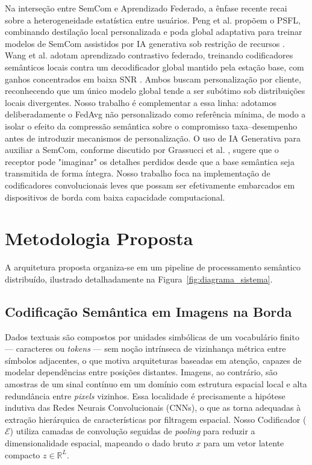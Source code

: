 \documentclass[conference]{IEEEtran}
\begin{document}
Na interseção entre SemCom e Aprendizado Federado, a ênfase recente recai sobre a heterogeneidade estatística entre usuários. Peng et al. propõem o PSFL, combinando destilação local personalizada e poda global adaptativa para treinar modelos de SemCom assistidos por IA generativa sob restrição de recursos \cite{peng2024psfl}. Wang et al. adotam aprendizado contrastivo federado, treinando codificadores semânticos locais contra um decodificador global mantido pela estação base, com ganhos concentrados em baixa SNR \cite{wang2024fedcl}. Ambos buscam personalização por cliente, reconhecendo que um único modelo global tende a ser subótimo sob distribuições locais divergentes. Nosso trabalho é complementar a essa linha: adotamos deliberadamente o FedAvg não personalizado como referência mínima, de modo a isolar o efeito da compressão semântica sobre o compromisso taxa--desempenho antes de introduzir mecanismos de personalização. O uso de IA Generativa para auxiliar a SemCom, conforme discutido por Grassucci et al. \cite{grassucci2023genai_meets_semcom}, sugere que o receptor pode "imaginar" os detalhes perdidos desde que a base semântica seja transmitida de forma íntegra. Nosso trabalho foca na implementação de codificadores convolucionais leves que possam ser efetivamente embarcados em dispositivos de borda com baixa capacidade computacional.

\section{Metodologia Proposta}

A arquitetura proposta organiza-se em um pipeline de processamento semântico distribuído, ilustrado detalhadamente na Figura~\ref{fig:diagrama_sistema}.

\subsection{Codificação Semântica em Imagens na Borda}
Dados textuais são compostos por unidades simbólicas de um vocabulário finito --- caracteres ou \textit{tokens} --- sem noção intrínseca de vizinhança métrica entre símbolos adjacentes, o que motiva arquiteturas baseadas em atenção, capazes de modelar dependências entre posições distantes. Imagens, ao contrário, são amostras de um sinal contínuo em um domínio com estrutura espacial local e alta redundância entre \textit{pixels} vizinhos. Essa localidade é precisamente a hipótese indutiva das Redes Neurais Convolucionais (CNNs), o que as torna adequadas à extração hierárquica de características por filtragem espacial. Nosso Codificador ($\mathcal{E}$) utiliza camadas de convolução seguidas de \textit{pooling} para reduzir a dimensionalidade espacial, mapeando o dado bruto $x$ para um vetor latente compacto $z \in \mathbb{R}^L$.
\end{document}
